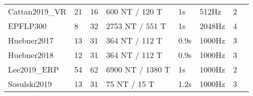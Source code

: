 \documentclass[twocolumn]{article}
\begin{document}
\begin{table}[h]
\begin{tabular}{@{}llllllll@{}}
		Cattan2019\_VR & 21                         & 16          & 600 NT / 120 T   & 1s    &
		512Hz          & 2                          &                                          \\
		EPFLP300       & 8                          & 32          & 2753 NT / 551 T  & 1s    &
		2048Hz         & 4                          &                                          \\
		Huebner2017    & 13                         & 31          & 364 NT / 112 T   & 0.9s  &
		1000Hz         & 3                          &                                          \\
		Huebner2018    & 12                         & 31          & 364 NT / 112 T   & 0.9s  &
		1000Hz         & 3                          &                                          \\
		Lee2019\_ERP   & 54                         & 62          & 6900 NT / 1380 T & 1s    &
		1000Hz         & 2                          &                                          \\
		Sosulski2019   & 13                         & 31          & 75 NT / 15 T     & 1.2s  &
		1000Hz         & 3                          &                                          \\ \bottomrule
	\end{tabular}
\end{table}
\end{document}
